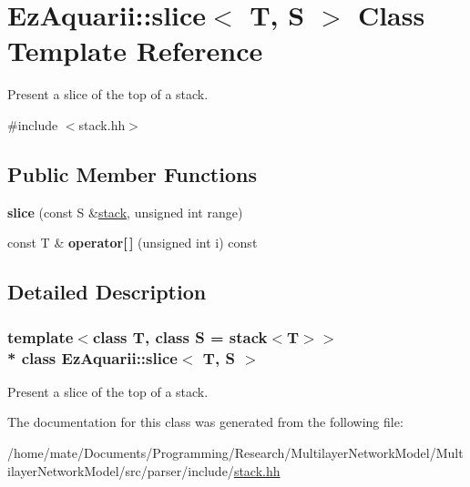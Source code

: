 \hypertarget{classEzAquarii_1_1slice}{}\section{Ez\+Aquarii\+:\+:slice$<$ T, S $>$ Class Template Reference}
\label{classEzAquarii_1_1slice}


Present a slice of the top of a stack.  




{\ttfamily \#include $<$stack.\+hh$>$}

\subsection*{Public Member Functions}
\begin{DoxyCompactItemize}
\item 
{\bfseries slice} (const S \&\hyperlink{classEzAquarii_1_1stack}{stack}, unsigned int range)\hypertarget{classEzAquarii_1_1slice_a90d7a60ac36593984754dee9129a0a66}{}\label{classEzAquarii_1_1slice_a90d7a60ac36593984754dee9129a0a66}

\item 
const T \& {\bfseries operator\mbox{[}$\,$\mbox{]}} (unsigned int i) const \hypertarget{classEzAquarii_1_1slice_a4f1d600ec9aa96b82c70ce8af576ab74}{}\label{classEzAquarii_1_1slice_a4f1d600ec9aa96b82c70ce8af576ab74}

\end{DoxyCompactItemize}


\subsection{Detailed Description}
\subsubsection*{template$<$class T, class S = stack$<$\+T$>$$>$\\*
class Ez\+Aquarii\+::slice$<$ T, S $>$}

Present a slice of the top of a stack. 

The documentation for this class was generated from the following file\+:\begin{DoxyCompactItemize}
\item 
/home/mate/\+Documents/\+Programming/\+Research/\+Multilayer\+Network\+Model/\+Multilayer\+Network\+Model/src/parser/include/\hyperlink{stack_8hh}{stack.\+hh}\end{DoxyCompactItemize}
